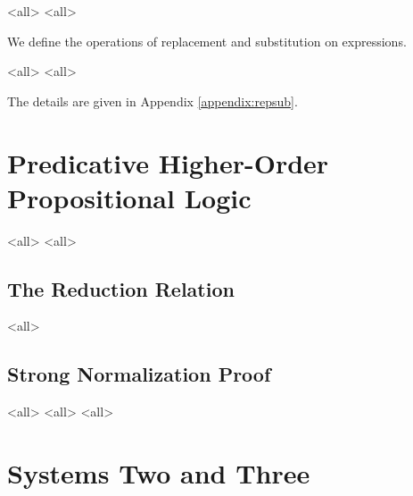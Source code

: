 
\mode<all>{}
\mode<all>{}

We define the operations of replacement and substitution on
expressions.  

\mode<all>{}
\mode<all>{}

The details are given in Appendix \ref{appendix:repsub}.








\section{Predicative Higher-Order Propositional Logic}

\mode<all>{}
\mode<all>{}

\subsection{The Reduction Relation}

\mode<all>{}

\subsection{Strong Normalization Proof}

\mode<all>{}
\mode<all>{}
\mode<all>{}

\section{Systems Two and Three}

